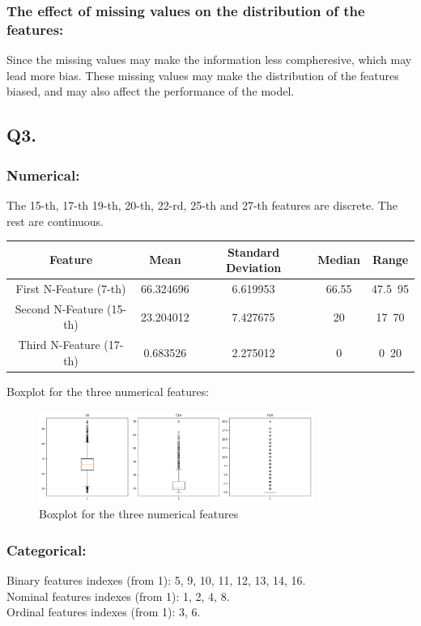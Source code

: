 \documentclass{article}
\begin{document}
\subsubsection*{The effect of missing values on the distribution of the features:}
Since the missing values may make the information less compheresive, which may lead more bias. These missing values may make the distribution of the features biased, and may also affect the performance of the model. 

\subsection*{Q3.}
\subsubsection*{Numerical:}
The 15-th, 17-th 19-th, 20-th, 22-rd, 25-th and 27-th features are discrete. The rest are continuous. 
\begin{center}
    \begin{tabular}{|c|c|c|c|c|}
        \hline
        Feature & Mean & Standard Deviation & Median & Range\\
        \hline
        First N-Feature (7-th)  & 66.324696  & 6.619953 & 66.55& 47.5~95 \\
        Second N-Feature (15-th)  & 23.204012 & 7.427675 & 20 & 17~70 \\
        Third N-Feature (17-th)  & 0.683526 & 2.275012 & 0 & 0~20 \\
        \hline
    \end{tabular}
\end{center}

Boxplot for the three numerical features:
\begin{figure}[h]
    \centering
    \includegraphics[width=0.8\textwidth]{./pic/boxplot.png}
    \caption{Boxplot for the three numerical features}
\end{figure}

\subsubsection*{Categorical:}
Binary features indexes (from 1): 5, 9, 10, 11, 12, 13, 14, 16.\\
Nominal features indexes (from 1): 1, 2, 4, 8.\\ 
Ordinal features indexes (from 1): 3, 6.\\
\end{document}
